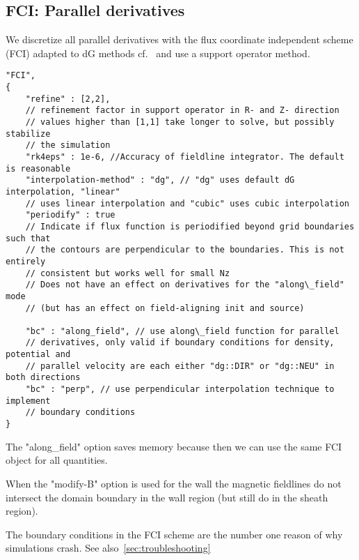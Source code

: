 \subsection{FCI: Parallel derivatives}
We discretize all parallel derivatives with the
flux coordinate independent scheme (FCI) adapted to dG methods
cf.~\cite{Held2016,Stegmeir2017}
and use a support operator method.
\begin{verbatim}
"FCI",
{
    "refine" : [2,2],
    // refinement factor in support operator in R- and Z- direction
    // values higher than [1,1] take longer to solve, but possibly stabilize
    // the simulation
    "rk4eps" : 1e-6, //Accuracy of fieldline integrator. The default is reasonable
    "interpolation-method" : "dg", // "dg" uses default dG interpolation, "linear"
    // uses linear interpolation and "cubic" uses cubic interpolation
    "periodify" : true
    // Indicate if flux function is periodified beyond grid boundaries such that
    // the contours are perpendicular to the boundaries. This is not entirely
    // consistent but works well for small Nz
    // Does not have an effect on derivatives for the "along\_field" mode
    // (but has an effect on field-aligning init and source)

    "bc" : "along_field", // use along\_field function for parallel
    // derivatives, only valid if boundary conditions for density, potential and
    // parallel velocity are each either "dg::DIR" or "dg::NEU" in both directions
    "bc" : "perp", // use perpendicular interpolation technique to implement
    // boundary conditions
}
\end{verbatim}

\begin{tcolorbox}[title=Note]
The "along\_field" option saves memory because then we can use
the same FCI object for all quantities.
\end{tcolorbox}
\begin{tcolorbox}[title=Note]
    When the "modify-B" option is used for the wall the magnetic fieldlines
    do not intersect the domain boundary in the wall region (but still do in the
    sheath region).
\end{tcolorbox}
\begin{tcolorbox}[title=Note]
The boundary conditions in the FCI scheme are the number one reason of why
simulations crash. See also~\ref{sec:troubleshooting}
\end{tcolorbox}


